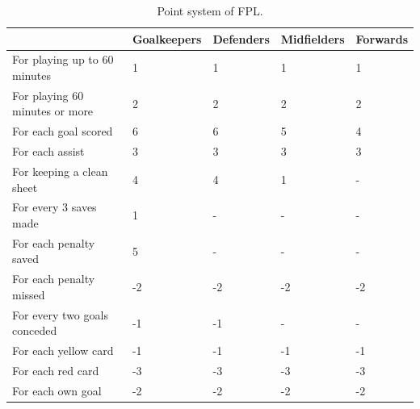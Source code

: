 \begin{table}[H]
\centering
\small
\begin{tabular}{|l|l|l|l|l|}
\hline
                               & Goalkeepers & Defenders & Midfielders & Forwards \\
\hline
For playing up to 60 minutes   & 1           & 1         & 1           & 1        \\
For playing 60 minutes or more & 2           & 2         & 2           & 2        \\
For each goal scored           & 6           & 6         & 5           & 4        \\
For each assist                & 3           & 3         & 3           & 3        \\
For keeping a clean sheet      & 4           & 4         & 1           & -        \\
For every 3 saves made         & 1           & -         & -           & -        \\
For each penalty saved         & 5           & -         & -           & -        \\
For each penalty missed        & -2          & -2        & -2          & -2       \\
For every two goals conceded   & -1          & -1        & -           & -        \\
For each yellow card           & -1          & -1        & -1          & -1       \\
For each red card              & -3          & -3        & -3          & -3       \\
For each own goal              & -2          & -2        & -2          & -2      \\
\hline
\end{tabular}
\caption{Point system of FPL.}
\end{table}

